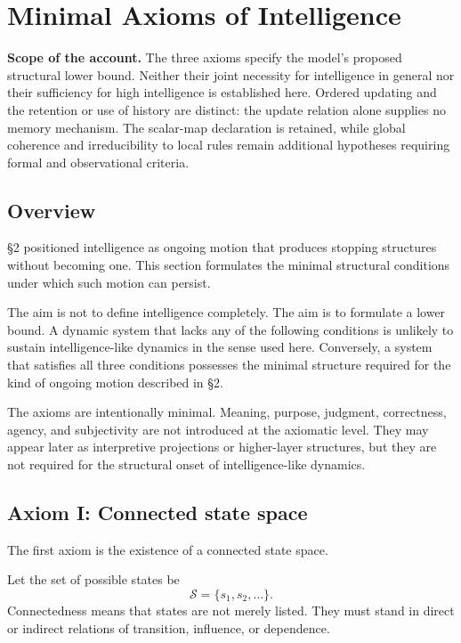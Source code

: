 \section{Minimal Axioms of Intelligence}

\noindent\textbf{Scope of the account.} The three axioms specify the model's proposed structural lower bound. Neither their joint necessity for intelligence in general nor their sufficiency for high intelligence is established here. Ordered updating and the retention or use of history are distinct: the update relation alone supplies no memory mechanism. The scalar-map declaration is retained, while global coherence and irreducibility to local rules remain additional hypotheses requiring formal and observational criteria.


\subsection{Overview}

\S{}2 positioned intelligence as ongoing motion that produces stopping structures without becoming one. This section formulates the minimal structural conditions under which such motion can persist.

The aim is not to define intelligence completely. The aim is to formulate a lower bound. A dynamic system that lacks any of the following conditions is unlikely to sustain intelligence-like dynamics in the sense used here. Conversely, a system that satisfies all three conditions possesses the minimal structure required for the kind of ongoing motion described in \S{}2.

The axioms are intentionally minimal. Meaning, purpose, judgment, correctness, agency, and subjectivity are not introduced at the axiomatic level. They may appear later as interpretive projections or higher-layer structures, but they are not required for the structural onset of intelligence-like dynamics.

\subsection{Axiom I: Connected state space}

The first axiom is the existence of a connected state space.

Let the set of possible states be
\[
\mathcal{S}=\{s_1,s_2,\dots\}.
\]
Connectedness means that states are not merely listed. They must stand in direct or indirect relations of transition, influence, or dependence.

